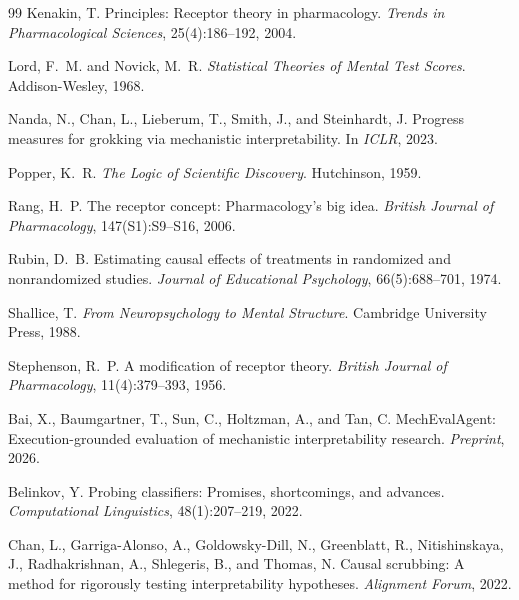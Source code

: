\documentclass[10pt]{article}
\begin{document}
\begin{thebibliography}{99}
Kenakin, T.
\newblock Principles: Receptor theory in pharmacology.
\newblock \emph{Trends in Pharmacological Sciences}, 25(4):186--192, 2004.

Lord, F.~M. and Novick, M.~R.
\newblock \emph{Statistical Theories of Mental Test Scores}.
\newblock Addison-Wesley, 1968.

Nanda, N., Chan, L., Lieberum, T., Smith, J., and Steinhardt, J.
\newblock Progress measures for grokking via mechanistic interpretability.
\newblock In \emph{ICLR}, 2023.

Popper, K.~R.
\newblock \emph{The Logic of Scientific Discovery}.
\newblock Hutchinson, 1959.

Rang, H.~P.
\newblock The receptor concept: Pharmacology's big idea.
\newblock \emph{British Journal of Pharmacology}, 147(S1):S9--S16, 2006.

Rubin, D.~B.
\newblock Estimating causal effects of treatments in randomized and nonrandomized studies.
\newblock \emph{Journal of Educational Psychology}, 66(5):688--701, 1974.

Shallice, T.
\newblock \emph{From Neuropsychology to Mental Structure}.
\newblock Cambridge University Press, 1988.

Stephenson, R.~P.
\newblock A modification of receptor theory.
\newblock \emph{British Journal of Pharmacology}, 11(4):379--393, 1956.

Bai, X., Baumgartner, T., Sun, C., Holtzman, A., and Tan, C.
\newblock MechEvalAgent: Execution-grounded evaluation of mechanistic interpretability research.
\newblock \emph{Preprint}, 2026.

Belinkov, Y.
\newblock Probing classifiers: Promises, shortcomings, and advances.
\newblock \emph{Computational Linguistics}, 48(1):207--219, 2022.

Chan, L., Garriga-Alonso, A., Goldowsky-Dill, N., Greenblatt, R., Nitishinskaya, J., Radhakrishnan, A., Shlegeris, B., and Thomas, N.
\newblock Causal scrubbing: A method for rigorously testing interpretability hypotheses.
\newblock \emph{Alignment Forum}, 2022.


\end{thebibliography}
\end{document}
